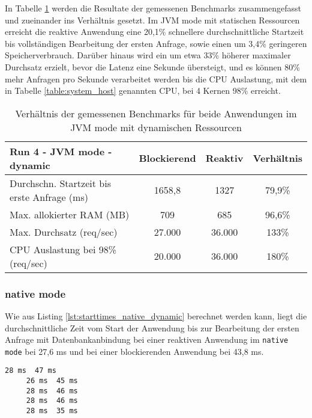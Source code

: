 In Tabelle \ref{table:dynamic_jvm_measurement_results} werden die Resultate der gemessenen Benchmarks zusammengefasst
und zueinander ins Verhältnis gesetzt. Im JVM mode mit statischen Ressourcen erreicht die reaktive Anwendung
eine 20,1\% schnellere durchschnittliche Startzeit bis vollständigen Bearbeitung der ersten Anfrage, sowie
einen um 3,4\% geringeren Speicherverbrauch.
Darüber hinaus wird ein um etwa 33\% höherer maximaler Durchsatz erzielt, bevor die Latenz eine Sekunde übersteigt, und
es können 80\% mehr Anfragen pro Sekunde verarbeitet werden bis die CPU Auslastung, mit dem in Tabelle \ref{table:system_host}
genannten CPU, bei 4 Kernen 98\% erreicht.

\begin{table}[ht!]
    \begin{tabular}{|l | c | c | c|}
        \hline
        Run 4 - JVM mode - dynamic & Blockierend & Reaktiv & Verhältnis \\
        \hline
        \makecell[l]{Durchschn. Startzeit bis                           \\erste Anfrage (ms)} &   1658,8    &  1327  &   79,9\%   \\
        \hline
        Max. allokierter RAM (MB)  & 709         & 685     & 96,6\%     \\
        \hline
        Max. Durchsatz (req/sec)   & 27.000      & 36.000  & 133\%      \\
        \hline
        \makecell[l]{CPU Auslastung bei 98\%                            \\ (req/sec)} & 20.000 & 36.000 & 180\%  \\
        \hline
    \end{tabular}
    \caption{Verhältnis der gemessenen Benchmarks für beide Anwendungen im JVM mode mit dynamischen Ressourcen}
    \label{table:dynamic_jvm_measurement_results}
\end{table}


\subsubsection{native mode}
\label{subsubsec:dynamic_native_mode}
Wie aus Listing \ref{lst:starttimes_native_dynamic} berechnet werden kann, liegt die durchschnittliche Zeit vom Start der Anwendung bis zur
Bearbeitung der ersten Anfrage mit Datenbankanbindung bei einer reaktiven Anwendung im \verb|native mode| bei 27,6 ms und bei einer
blockierenden Anwendung bei 43,8 ms.

\begin{lstlisting}[caption=5 gemessene Startzeiten bis zur Bearbeitung der ersten Anfrage als native-Anwendungen: links ist die reaktive
     Anwendung und rechts die blockierende Anwendung, captionpos=b, label=lst:starttimes_native_dynamic]
     28 ms  47 ms
     26 ms  45 ms
     28 ms  46 ms
     28 ms  46 ms
     28 ms  35 ms
\end{lstlisting}

